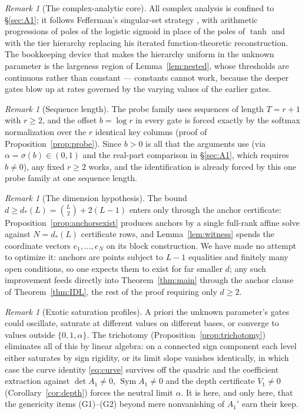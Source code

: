 \documentclass[11pt]{article}
\theoremstyle{definition}
\theoremstyle{remark}
\newtheorem{remark}[theorem]{Remark}
\theoremstyle{plain}
\newcommand{\Sym}{\operatorname{Sym}}
\newcommand{\sig}{\sigma}
\begin{document}
\begin{remark}[The complex-analytic core]\label{rem:complexcore}
All complex analysis is confined to \S\ref{sec:A1}; it follows Fefferman's singular-set
strategy \cite{fefferman1994reconstructing}, with arithmetic progressions of poles of
the logistic sigmoid in place of the poles of $\tanh$ and with the tier hierarchy
replacing his iterated function-theoretic reconstruction.  The bookkeeping device that
makes the hierarchy uniform in the unknown parameter is the largeness region of
Lemma~\ref{lem:nested}, whose thresholds are continuous rather than constant ---
constants cannot work, because the deeper gates blow up at rates governed by the
varying values of the earlier gates.
\end{remark}

\begin{remark}[Sequence length]\label{rem:seqlength}
The probe family uses sequences of length $T=r+1$ with $r\ge2$, and the offset
$b=\log r$ in every gate is forced exactly by the softmax normalization over the $r$
identical key columns (proof of Proposition~\ref{prop:probe}).  Since $b>0$ is all
that the arguments use (via $\alpha=\sig(b)\in(0,1)$ and the real-part comparison in
\S\ref{sec:A1}, which requires $b\neq0$), any fixed $r\ge2$ works, and the
identification is already forced by this one probe family at one sequence length.
\end{remark}

\begin{remark}[The dimension hypothesis]\label{rem:dimension}
The bound $d\ge d_*(L)=\binom L2+2(L-1)$ enters only through the anchor certificate:
Proposition~\ref{prop:anchorsexist} produces anchors by a single full-rank affine
solve against $N=d_*(L)$ certificate rows, and Lemma~\ref{lem:witness} spends the
coordinate vectors $e_1,\dots,e_N$ on its block construction.  We have made no attempt
to optimize it: anchors are points subject to $L-1$ equalities and finitely many open
conditions, so one expects them to exist for far smaller $d$; any such improvement
feeds directly into Theorem~\ref{thm:main} through the anchor clause of
Theorem~\ref{thm:IDL}, the rest of the proof requiring only $d\ge2$.
\end{remark}

\begin{remark}[Exotic saturation profiles]\label{rem:exotic}
A priori the unknown parameter's gates could oscillate, saturate at different values
on different bases, or converge to values outside $\{0,1,\alpha\}$.  The trichotomy
(Proposition~\ref{prop:trichotomy}) eliminates all of this by linear algebra: on a
connected sign component each level either saturates by sign rigidity, or its limit
slope vanishes identically, in which case the curve identity \eqref{eq:curve} survives
off the quadric and the coefficient extraction against $\det A_1\neq0$,
$\Sym A_1\neq0$ and the depth certificate $V_1\neq0$ (Corollary~\ref{cor:depth})
forces the neutral limit $\alpha$.  It is here, and only here, that the genericity
items (G1)--(G2) beyond mere nonvanishing of $A_1'$ earn their keep.
\end{remark}
\end{document}
